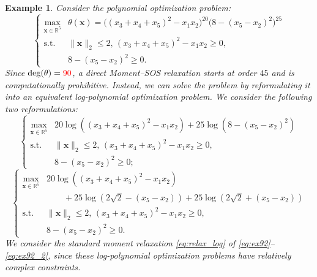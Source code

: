 \documentclass[pdflatex,sn-mathphys-num]{sn-jnl}%
\newcommand{\re}{\mathbb{R}}
\newcommand{\rd}[1]{{\color{red}#1}}
\newcommand{\vect}[1]{\boldsymbol{#1}}
\newcommand{\st}{\mathrm{s.t.}}
\theoremstyle{thmstyleone}%
\theoremstyle{thmstyletwo}%
\newtheorem{example}{Example}%
\theoremstyle{thmstylethree}%
\begin{document}
\begin{example}\label{ex:92}
	Consider the polynomial optimization problem:
	\[
	\left\{\begin{array}{cl}
		\max\limits_{\vect{x}\in\re^5} 
		& \theta(\vect{x}) = \big((x_3+x_4+x_5)^2-x_1x_2\big)^{20}\big(8-(x_5-x_2)^2\big)^{25}\\
		\st & \|\vect{x}\|_{2}\le 2,\, (x_3+x_4+x_5)^2-x_1x_2\ge 0,\\
		&  8-(x_5-x_2)^2\ge 0.
	\end{array}
	\right.
	\]
	Since $\deg(\theta) = \rd{90}$, \rd{a direct Moment--SOS relaxation
	starts at order $45$ and is computationally prohibitive.}
	Instead, we can solve the problem by reformulating it into 
	an equivalent log-polynomial optimization problem.
	We consider the following two reformulations:
	\begin{equation}\label{eq:ex92}
		\left\{\begin{array}{cl}
			\max\limits_{\vect{x} \in \mathbb{R}^5} &  20\log\left((x_3+x_4+x_5)^2-x_1x_2\right)+25\log\left(8-(x_5-x_2)^2\right)\\
			\st & \|\vect{x}\|_{2}\le 2,\, (x_3+x_4+x_5)^2-x_1x_2\ge 0,\\
			&  8-(x_5-x_2)^2\ge 0;
		\end{array}\right.
	\end{equation}
	\begin{equation}
		\label{eq:ex92_2}
		\left\{\begin{array}{cl}
			\max\limits_{\vect{x} \in \mathbb{R}^5} &  20\log\left((x_3+x_4+x_5)^2-x_1x_2\right)\\
			& \qquad +25\log\left(2\sqrt{2}-(x_5-x_2)\right)
			+25\log\left(2\sqrt{2}+(x_5-x_2)\right)\\
			\st & \|\vect{x}\|_{2}\le 2,\, (x_3+x_4+x_5)^2-x_1x_2\ge 0,\\
			&  8-(x_5-x_2)^2\ge 0.
		\end{array}\right.
	\end{equation}
	We consider the standard moment relaxation \eqref{eq:relax_log} of 
	\eqref{eq:ex92}--\eqref{eq:ex92_2},
	since these log-polynomial optimization problems have
	relatively complex constraints.
	

\end{example}
\end{document}
